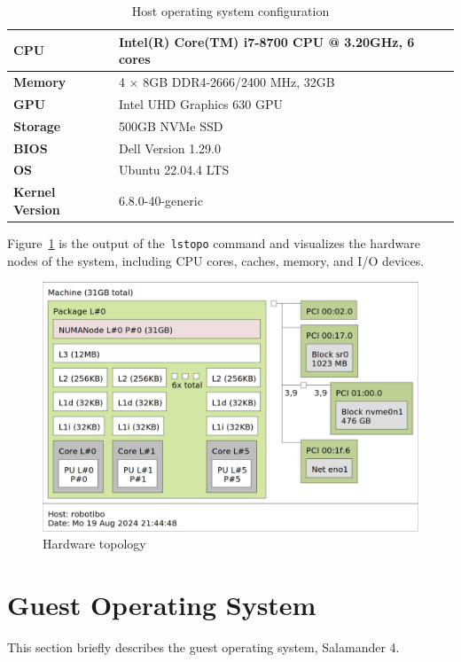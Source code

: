 \documentclass[MMR,Master,english]{twbook}
\begin{document}
\begin{table}[H]
	\centering
	\caption[Host operating system configuration]{Host operating system configuration}
	\label{tab:testbed_configuration}
	\setlength{\tabcolsep}{0.5em} %
	{\renewcommand{\arraystretch}{1.2}%
		\begin{tabular}{|l|l|}
			\hline
			\textbf{CPU}            & Intel(R) Core(TM) i7-8700 CPU @ 3.20GHz, 6 cores \\ \hline
			\textbf{Memory}         & 4 $\times$ 8GB DDR4-2666/2400 MHz, 32GB          \\ \hline
			\textbf{GPU}            & Intel UHD Graphics 630 GPU                       \\ \hline
			\textbf{Storage}        & 500GB NVMe SSD                                   \\ \hline
			\textbf{BIOS}           & Dell Version 1.29.0                              \\ \hline
			\textbf{OS}             & Ubuntu 22.04.4 LTS                               \\ \hline
			\textbf{Kernel Version} & 6.8.0-40-generic                                 \\ \hline
		\end{tabular}}
\end{table}

\noindent Figure~\ref{fig:lstopo} is the output of the~\texttt{lstopo} command and visualizes the hardware nodes of the system, including CPU cores, caches, memory, and I/O devices.
\begin{figure}[H]
	\centering
	\includegraphics[width=0.55\columnwidth]{img/lstopo.png}
	\caption[Hardware topology]{Hardware topology}
	\label{fig:lstopo}
\end{figure}



\section{Guest Operating System}\label{sec:guest_operating_system}
This section briefly describes the guest operating system, Salamander 4.
\end{document}
